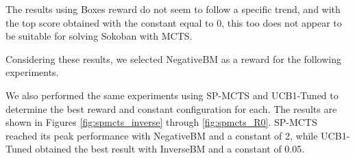 \begin{figure}[!h]
\centering
{}
\caption[Boxes solved levels rate and tree depth]{}
\label{fig:constant_Boxes}
\end{figure}

\medskip\noindent
The results using Boxes reward do not seem to follow a specific trend, and with the top score obtained with the constant equal to 0, this too does not appear to be suitable for solving Sokoban with MCTS.

\medskip\noindent
Considering these results, we selected NegativeBM as a reward for the following experiments.

\medskip\noindent
We also performed the same experiments using SP-MCTS and UCB1-Tuned to determine the best reward and constant configuration for each. The results are shown in Figures \ref{fig:spmcts_inverse} through \ref{fig:spmcts_R0}. SP-MCTS reached its peak performance with NegativeBM and a constant of 2, while UCB1-Tuned obtained the best result with InverseBM and a constant of 0.05.

